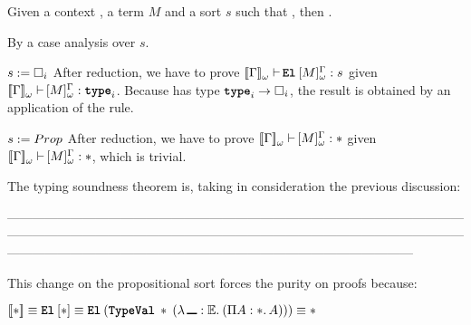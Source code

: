 \begin{Lemma}
\label{lemma:wtrans_sort_involutive}
Given a context \Context{}, a term $M$ and a sort $s$ such that 
, then 
.
\end{Lemma}

\begin{Proof}
By a case analysis over $s$.
\begin{ProofCase}{$s \termDef \Type$}
After reduction, we have to prove $\ctyping[][\WContextTrans{\Context}]{\app{\El}{\WTrans{M}}}{s}$
given $\ctyping[][\WContextTrans{\Context}]{\WTrans{M}}{\type}$. Because \El{} has type
$\arrow{\type}{\Type}$, the result is obtained by an application of the \CicApp{} rule.
\end{ProofCase}

\begin{ProofCase}{$s := Prop$}
After reduction, we have to prove $\ctyping[][\WContextTrans{\Context}]{\WTrans{M}}{\Prop}$
given $\ctyping[][\WContextTrans{\Context}]{\WTrans{M}}{\Prop}$, which is trivial.
\end{ProofCase}
\end{Proof}





The typing soundness theorem is, taking in consideration the previous discussion:




\noindent------------------------------------------------------------------------------------------------------------------------------------------------------------------------------------------------------------------------------------------------------------------------------------------------------------------------


This change on the propositional sort forces the purity on proofs because:
\begin{center}
    $\TypeTrans{\Prop}
    \equiv
    \app{\El}{\Trans{\Prop}}
    \equiv
    \app{\El}{ (\app{\TypeVal}{\Prop}{(\abs{\,\noBinder}{\ExceptionType}{
                                            (\depArrow{A}{\Prop}{A}) })}) }
    \equiv
    \Prop$
\end{center}



